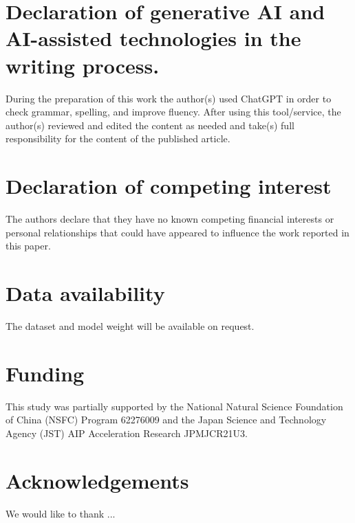 \documentclass[12pt]{article}
\begin{document}
\section*{Declaration of generative AI and AI-assisted technologies in the writing process.}
During the preparation of this work the author(s) used ChatGPT in order to check grammar, spelling, and improve fluency. After using this tool/service, the author(s) reviewed and edited the content as needed and take(s) full responsibility for the content of the published article.

\section*{Declaration of competing interest}
The authors declare that they have no known competing financial interests or personal relationships that could have appeared to influence the work reported in this paper.

\section*{Data availability}
The dataset and model weight will be available on request.

\section*{Funding}
This study was partially supported by the National Natural Science Foundation of China (NSFC) Program 62276009 and the Japan Science and Technology Agency (JST) AIP Acceleration Research JPMJCR21U3.

\section*{Acknowledgements}
We would like to thank ...

{\clearpage}



\end{document}
